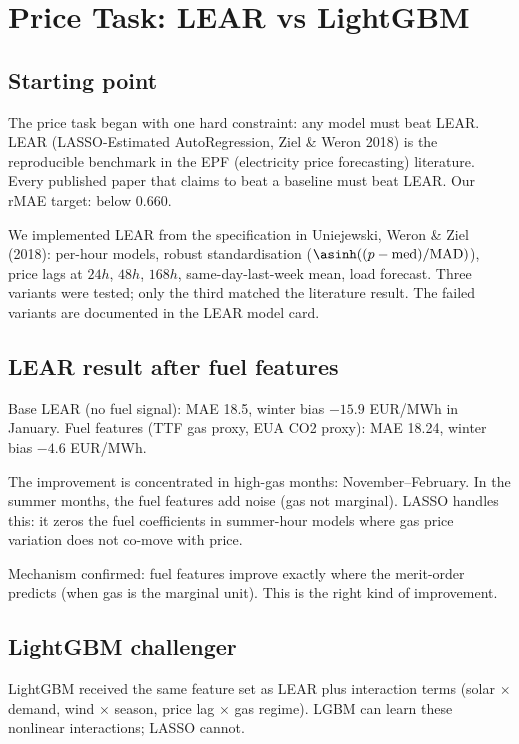 \section{Price Task: LEAR vs LightGBM}

\subsection{Starting point}

The price task began with one hard constraint: any model must beat LEAR.
LEAR (LASSO-Estimated AutoRegression, Ziel \& Weron 2018) is the
reproducible benchmark in the EPF (electricity price forecasting) literature.
Every published paper that claims to beat a baseline must beat LEAR.
Our rMAE target: below 0.660.

We implemented LEAR from the specification in Uniejewski, Weron \& Ziel (2018):
per-hour models, robust standardisation ($\asinh((p-\text{med})/\text{MAD})$),
price lags at $24h$, $48h$, $168h$, same-day-last-week mean, load forecast.
Three variants were tested; only the third matched the literature result.
The failed variants are documented in the LEAR model card.

\subsection{LEAR result after fuel features}

Base LEAR (no fuel signal): MAE 18.5, winter bias $-15.9$ EUR/MWh in January.
Fuel features (TTF gas proxy, EUA CO2 proxy): MAE 18.24, winter bias $-4.6$ EUR/MWh.

The improvement is concentrated in high-gas months: November--February.
In the summer months, the fuel features add noise (gas not marginal).
LASSO handles this: it zeros the fuel coefficients in summer-hour models
where gas price variation does not co-move with price.

Mechanism confirmed: fuel features improve exactly where the merit-order
predicts (when gas is the marginal unit). This is the right kind of improvement.

\subsection{LightGBM challenger}

LightGBM received the same feature set as LEAR plus interaction terms
(solar $\times$ demand, wind $\times$ season, price lag $\times$ gas regime).
LGBM can learn these nonlinear interactions; LASSO cannot.

